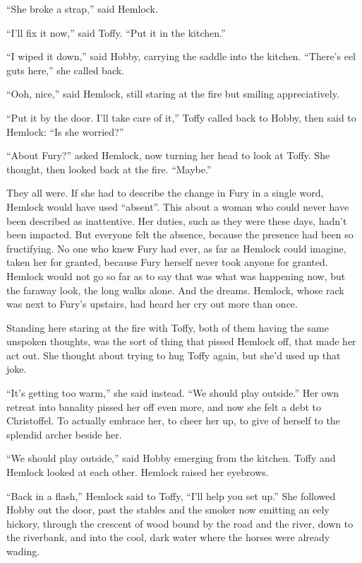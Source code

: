 \documentclass[11pt,a5paper]{article}
\begin{document}
``She broke a strap,'' said Hemlock.

``I'll fix it now,'' said Toffy. ``Put it in the kitchen.''

``I wiped it down,'' said Hobby, carrying the saddle into the kitchen. ``There's eel guts here,'' she called back.

``Ooh, nice,'' said Hemlock, still staring at the fire but smiling appreciatively.

``Put it by the door. I'll take care of it,'' Toffy called back to Hobby, then said to Hemlock: ``Is she worried?''

``About Fury?'' asked Hemlock, now turning her head to look at Toffy. She thought, then looked back at the fire. ``Maybe.''

They all were. If she had to describe the change in Fury in a single word, Hemlock would have used ``absent''. This about a woman who could never have been described as inattentive. Her duties, such as they were these days, hadn't been impacted. But everyone felt the absence, because the presence had been so fructifying. No one who knew Fury had ever, as far as Hemlock could imagine, taken her for granted, because Fury herself never took anyone for granted. Hemlock would not go so far as to say that was what was happening now, but the faraway look, the long walks alone. And the dreams. Hemlock, whose rack was next to Fury's upstairs, had heard her cry out more than once.

Standing here staring at the fire with Toffy, both of them having the same unspoken thoughts, was the sort of thing that pissed Hemlock off, that made her act out. She thought about trying to hug Toffy again, but she'd used up that joke.

``It's getting too warm,'' she said instead. ``We should play outside.'' Her own retreat into banality pissed her off even more, and now she felt a debt to Christoffel. To actually embrace her, to cheer her up, to give of herself to the splendid archer beside her.

``We should play outside,'' said Hobby emerging from the kitchen. Toffy and Hemlock looked at each other. Hemlock raised her eyebrows.

``Back in a flash,'' Hemlock said to Toffy, ``I'll help you set up.'' She followed Hobby out the door, past the stables and the smoker now emitting an eely hickory, through the crescent of wood bound by the road and the river, down to the riverbank, and into the cool, dark water where the horses were already wading.
\end{document}
